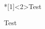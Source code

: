 \documentclass[
    12pt,
    Paysage,
]{PrRJexos}
\begin{document}
\begin{exercice}*[1]<2>Test
    \begin{Correction}
        Test
    \end{Correction}
\end{exercice}
\end{document}
